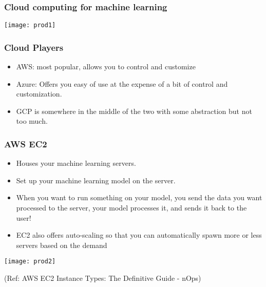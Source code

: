 \begin{frame}\frametitle{Cloud computing for machine learning}
\begin{center}
\texttt{[image: prod1]}
\end{center}
\end{frame}

\begin{frame}\frametitle{Cloud Players}
\begin{itemize}
\item AWS: most popular, allows you to control and customize 
\item Azure: Offers you easy of use at the expense of a bit of control and customization. 
\item GCP is somewhere in the middle of the two with some abstraction but not too much.
\end{itemize}
\end{frame}

\begin{frame}\frametitle{AWS EC2}
\begin{itemize}
\item Houses your machine learning servers. 
\item Set up your machine learning model on the server. 
\item When you want to run something on your model, you send the data you want processed to the server, your model processes it, and sends it back to the user! 
\item EC2 also offers auto-scaling so that you can automatically spawn more or less servers based on the demand
\end{itemize}

\begin{center}
\texttt{[image: prod2]}
\end{center}

{\tiny (Ref: AWS EC2 Instance Types: The Definitive Guide - nOps)}
\end{frame}

